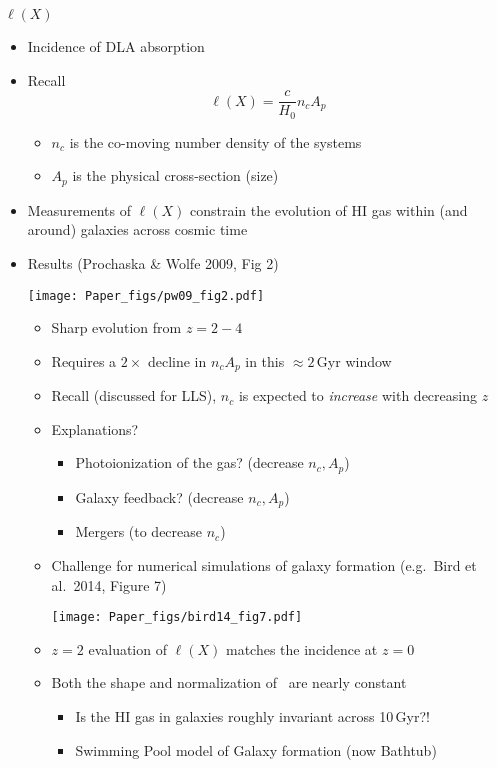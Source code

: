 \documentclass[12pt,letterpaper]{article}
\begin{document}
\begin{Aenumerate}
{\bf \item $\ell(X)$}
  \begin{itemize}
  \item Incidence of DLA absorption
  \item Recall
  \begin{equation}
  \ell(X) = \frac{c}{H_0} n_c A_p
  \end{equation}
    \begin{itemize}
    \item $n_c$ is the co-moving number density of the systems
    \item $A_p$ is the physical cross-section (size)
    \end{itemize}
  \item Measurements of $\ell(X)$ constrain the evolution of 
  HI gas within (and around) galaxies across cosmic time
  \item Results (Prochaska \& Wolfe 2009, Fig 2)

  \texttt{[image: Paper\_figs/pw09\_fig2.pdf]}

    \begin{itemize}
    \item Sharp evolution from $z=2-4$
    \item Requires a $2\times$ decline in $n_c A_p$ in this
    $\approx 2$\,Gyr window
    \item Recall (discussed for LLS), $n_c$ is expected to
    {\it increase} with decreasing $z$
    \item Explanations?
      \begin{itemize}
      \item Photoionization of the gas? (decrease $n_c, A_p$)
      \item Galaxy feedback? (decrease $n_c, A_p$)
      \item Mergers (to decrease $n_c$)
      \end{itemize}
    \item Challenge for numerical simulations of galaxy formation
    (e.g.\ Bird et al.\ 2014, Figure 7)

\texttt{[image: Paper\_figs/bird14\_fig7.pdf]}

    \item $z=2$ evaluation of $\ell(X)$ matches the incidence at $z=0$
     \item Both the shape and normalization of \fnhi\ are nearly constant
      \begin{itemize}
      \item Is the HI gas in galaxies roughly invariant across
      10\,Gyr?!  
      \item Swimming Pool model of Galaxy formation (now Bathtub)


\end{itemize}
\end{itemize}
\end{itemize}
\end{Aenumerate}
\end{document}
